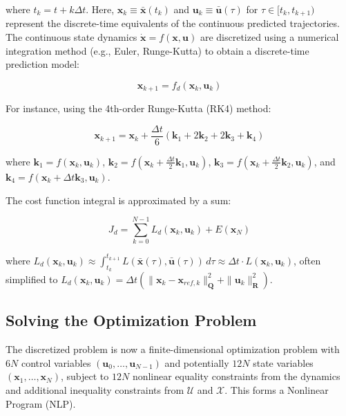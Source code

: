 where $t_k = t + k\Delta t$. Here, $\boldsymbol{x}_k \equiv \boldsymbol{\bar{x}}(t_k)$ and $\mathbf{u}_k \equiv \mathbf{\bar{u}}(\tau)$ for $\tau \in [t_k, t_{k+1})$ represent the discrete-time equivalents of the continuous predicted trajectories. The continuous state dynamics $\dot{\boldsymbol{x}} = f(\boldsymbol{x}, \mathbf{u})$ are discretized using a numerical integration method (e.g., Euler, Runge-Kutta) to obtain a discrete-time prediction model:

\begin{equation}
    \boldsymbol{x}_{k+1} = f_d(\boldsymbol{x}_k, \mathbf{u}_k)
\end{equation}

For instance, using the 4th-order Runge-Kutta (RK4) method:

\begin{equation}
    \boldsymbol{x}_{k+1} = \boldsymbol{x}_k + \frac{\Delta t}{6}(\mathbf{k}_1 + 2\mathbf{k}_2 + 2\mathbf{k}_3 + \mathbf{k}_4)
\end{equation}

where $\mathbf{k}_1 = f(\boldsymbol{x}_k, \mathbf{u}_k)$, $\mathbf{k}_2 = f(\boldsymbol{x}_k + \frac{\Delta t}{2}\mathbf{k}_1, \mathbf{u}_k)$, $\mathbf{k}_3 = f(\boldsymbol{x}_k + \frac{\Delta t}{2}\mathbf{k}_2, \mathbf{u}_k)$, and $\mathbf{k}_4 = f(\boldsymbol{x}_k + \Delta t \mathbf{k}_3, \mathbf{u}_k)$.

The cost function integral is approximated by a sum:

\begin{equation}
    J_d = \sum_{k=0}^{N-1} L_d(\boldsymbol{x}_k, \mathbf{u}_k) + E(\boldsymbol{x}_N)
\end{equation}

where $L_d(\boldsymbol{x}_k, \mathbf{u}_k) \approx \int_{t_k}^{t_{k+1}} L(\boldsymbol{\bar{x}}(\tau), \mathbf{\bar{u}}(\tau)) \, d\tau \approx \Delta t \cdot L(\boldsymbol{x}_k, \mathbf{u}_k)$, often simplified to $L_d(\boldsymbol{x}_k, \mathbf{u}_k) = \Delta t \left( \|\boldsymbol{x}_k - \boldsymbol{x}_{ref,k}\|_{\boldsymbol{Q}}^2 + \|\mathbf{u}_k\|_{\boldsymbol{R}}^2 \right)$.

\subsection{Solving the Optimization Problem}

The discretized problem is now a finite-dimensional optimization problem with $6N$ control variables $(\mathbf{u}_0, \ldots, \mathbf{u}_{N-1})$ and potentially $12N$ state variables $(\boldsymbol{x}_1, \ldots, \boldsymbol{x}_N)$, subject to $12N$ nonlinear equality constraints from the dynamics and additional inequality constraints from $\mathcal{U}$ and $\mathcal{X}$. This forms a Nonlinear Program (NLP).


